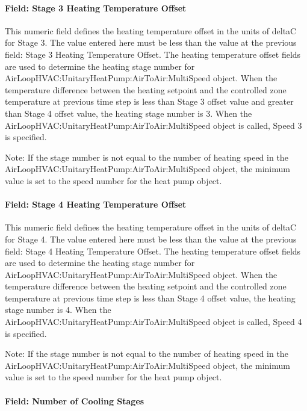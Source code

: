 \paragraph{Field: Stage 3 Heating Temperature Offset}\label{field-stage-3-heating-temperature-offset}

This numeric field defines the heating temperature offset in the units of deltaC for Stage 3. The value entered here must be less than the value at the previous field: Stage 3 Heating Temperature Offset. The heating temperature offset fields are used to determine the heating stage number for AirLoopHVAC:UnitaryHeatPump:AirToAir:MultiSpeed object. When the temperature difference between the heating setpoint and the controlled zone temperature at previous time step is less than Stage 3 offset value and greater than Stage 4 offset value, the heating stage number is 3. When the AirLoopHVAC:UnitaryHeatPump:AirToAir:MultiSpeed object is called, Speed 3 is specified.

Note: If the stage number is not equal to the number of heating speed in the AirLoopHVAC:UnitaryHeatPump:AirToAir:MultiSpeed object, the minimum value is set to the speed number for the heat pump object.

\paragraph{Field: Stage 4 Heating Temperature Offset}\label{field-stage-4-heating-temperature-offset}

This numeric field defines the heating temperature offset in the units of deltaC for Stage 4. The value entered here must be less than the value at the previous field: Stage 4 Heating Temperature Offset. The heating temperature offset fields are used to determine the heating stage number for AirLoopHVAC:UnitaryHeatPump:AirToAir:MultiSpeed object. When the temperature difference between the heating setpoint and the controlled zone temperature at previous time step is less than Stage 4 offset value, the heating stage number is 4. When the AirLoopHVAC:UnitaryHeatPump:AirToAir:MultiSpeed object is called, Speed 4 is specified.

Note: If the stage number is not equal to the number of heating speed in the AirLoopHVAC:UnitaryHeatPump:AirToAir:MultiSpeed object, the minimum value is set to the speed number for the heat pump object.

\paragraph{Field: Number of Cooling Stages}\label{field-number-of-cooling-stages}

